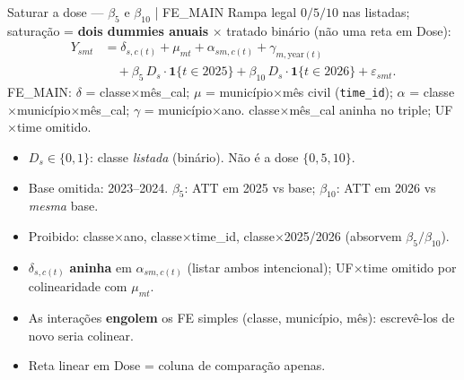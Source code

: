 \documentclass[aspectratio=169,11pt]{beamer}
\newcommand{\Ds}{D_s}
\begin{document}
\begin{frame}{Saturar a dose --- \(\beta_5\) e \(\beta_{10}\) | FE\_MAIN}
Rampa legal \(0/5/10\) nas listadas; saturação = \textbf{dois dummies anuais}
\(\times\) tratado binário (não uma reta em Dose):
\begin{equation*}
\begin{aligned}
Y_{smt}
&=
\delta_{s,c(t)}+\mu_{mt}+\alpha_{sm,c(t)}+\gamma_{m,\mathrm{year}(t)} \\
&\quad
+\beta_5\,\Ds\cdot\mathbf{1}\{t\in 2025\}
+\beta_{10}\,\Ds\cdot\mathbf{1}\{t\in 2026\}
+\varepsilon_{smt}.
\end{aligned}
\end{equation*}
{\footnotesize FE\_MAIN: \(\delta\) = classe\(\times\)mês\_cal; \(\mu\) = município\(\times\)mês civil (\texttt{time\_id});
\(\alpha\) = classe\(\times\)município\(\times\)mês\_cal; \(\gamma\) = município\(\times\)ano.
classe\(\times\)mês\_cal aninha no triple; UF\(\times\)time omitido.}
\begin{itemize}
  \item \(\Ds\in\{0,1\}\): classe \emph{listada} (binário). Não é a dose \(\{0,5,10\}\).
  \item Base omitida: 2023--2024. \(\beta_5\): ATT em 2025 vs base; \(\beta_{10}\): ATT em 2026 vs \emph{mesma} base.
  \item Proibido: classe\(\times\)ano, classe\(\times\)time\_id, classe\(\times\)2025/2026 (absorvem \(\beta_5/\beta_{10}\)).
  \item \(\delta_{s,c(t)}\) \textbf{aninha} em \(\alpha_{sm,c(t)}\) (listar ambos intencional); UF\(\times\)time omitido por colinearidade com \(\mu_{mt}\).
  \item As interações \textbf{engolem} os FE simples (classe, município, mês): escrevê-los de novo seria colinear.
  \item Reta linear em Dose = coluna de comparação apenas.
\end{itemize}
\end{frame}

\end{document}
